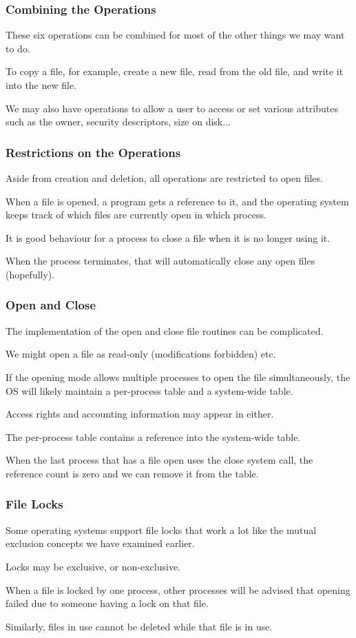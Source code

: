 \begin{frame}
\frametitle{Combining the Operations}

These six operations can be combined for most of the other things we may want to do. 

To copy a file, for example, create a new file, read from the old file, and write it into the new file. 

We may also have operations to allow a user to access or set various attributes such as the owner, security descriptors, size on disk...

\end{frame}

\begin{frame}
\frametitle{Restrictions on the Operations}

Aside from creation and deletion, all operations are restricted to open files.

When a file is opened, a program gets a reference to it, and the operating system keeps track of which files are currently open in which process. 

It is good behaviour for a process to close a file when it is no longer using it.

When the process terminates, that will automatically close any open files (hopefully).

\end{frame}

\begin{frame}
\frametitle{Open and Close}

The implementation of the open and close file routines can be complicated. 

We might open a file as read-only (modifications forbidden) etc. 

If the opening mode allows multiple processes to open the file simultaneously, the OS will likely maintain a per-process table and a system-wide table. 

Access rights and accounting information may appear in either. 

The per-process table contains a reference into the system-wide table. 

When the last process that has a file open uses the close system call, the reference count is zero and we can remove it from the table.


\end{frame}

\begin{frame}
\frametitle{File Locks}

Some operating systems support file locks that work a lot like the mutual exclusion concepts we have examined earlier. 

Locks may be exclusive, or non-exclusive. 

When a file is locked by one process, other processes will be advised that opening failed due to someone having a lock on that file. 

Similarly, files in use cannot be deleted while that file is in use. 

\end{frame}


